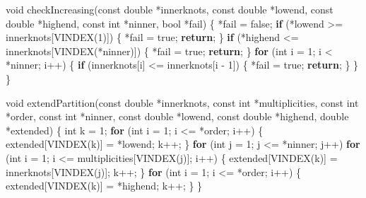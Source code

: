 \documentclass[
  12pt,
]{article}
\newenvironment{Shaded}{\begin{snugshade}}{\end{snugshade}}
\newcommand{\ControlFlowTok}[1]{\textcolor[rgb]{0.13,0.29,0.53}{\textbf{#1}}}
\newcommand{\DataTypeTok}[1]{\textcolor[rgb]{0.13,0.29,0.53}{#1}}
\newcommand{\DecValTok}[1]{\textcolor[rgb]{0.00,0.00,0.81}{#1}}
\newcommand{\NormalTok}[1]{#1}
\begin{document}
\begin{Shaded}
\begin{Highlighting}[]
\DataTypeTok{void}\NormalTok{ checkIncreasing(}\DataTypeTok{const} \DataTypeTok{double}\NormalTok{ *innerknots, }\DataTypeTok{const} \DataTypeTok{double}\NormalTok{ *lowend,}
                     \DataTypeTok{const} \DataTypeTok{double}\NormalTok{ *highend, }\DataTypeTok{const} \DataTypeTok{int}\NormalTok{ *ninner, }\DataTypeTok{bool}\NormalTok{ *fail) \{}
\NormalTok{    *fail = false;}
    \ControlFlowTok{if}\NormalTok{ (*lowend \textgreater{}= innerknots[VINDEX(}\DecValTok{1}\NormalTok{)]) \{}
\NormalTok{        *fail = true;}
        \ControlFlowTok{return}\NormalTok{;}
\NormalTok{    \}}
    \ControlFlowTok{if}\NormalTok{ (*highend \textless{}= innerknots[VINDEX(*ninner)]) \{}
\NormalTok{        *fail = true;}
        \ControlFlowTok{return}\NormalTok{;}
\NormalTok{    \}}
    \ControlFlowTok{for}\NormalTok{ (}\DataTypeTok{int}\NormalTok{ i = }\DecValTok{1}\NormalTok{; i \textless{} *ninner; i++) \{}
        \ControlFlowTok{if}\NormalTok{ (innerknots[i] \textless{}= innerknots[i {-} }\DecValTok{1}\NormalTok{]) \{}
\NormalTok{            *fail = true;}
            \ControlFlowTok{return}\NormalTok{;}
\NormalTok{        \}}
\NormalTok{    \}}
\NormalTok{\}}

\DataTypeTok{void}\NormalTok{ extendPartition(}\DataTypeTok{const} \DataTypeTok{double}\NormalTok{ *innerknots, }\DataTypeTok{const} \DataTypeTok{int}\NormalTok{ *multiplicities,}
                     \DataTypeTok{const} \DataTypeTok{int}\NormalTok{ *order, }\DataTypeTok{const} \DataTypeTok{int}\NormalTok{ *ninner, }\DataTypeTok{const} \DataTypeTok{double}\NormalTok{ *lowend,}
                     \DataTypeTok{const} \DataTypeTok{double}\NormalTok{ *highend, }\DataTypeTok{double}\NormalTok{ *extended) \{}
    \DataTypeTok{int}\NormalTok{ k = }\DecValTok{1}\NormalTok{;}
    \ControlFlowTok{for}\NormalTok{ (}\DataTypeTok{int}\NormalTok{ i = }\DecValTok{1}\NormalTok{; i \textless{}= *order; i++) \{}
\NormalTok{        extended[VINDEX(k)] = *lowend;}
\NormalTok{        k++;}
\NormalTok{    \}}
    \ControlFlowTok{for}\NormalTok{ (}\DataTypeTok{int}\NormalTok{ j = }\DecValTok{1}\NormalTok{; j \textless{}= *ninner; j++)}
        \ControlFlowTok{for}\NormalTok{ (}\DataTypeTok{int}\NormalTok{ i = }\DecValTok{1}\NormalTok{; i \textless{}= multiplicities[VINDEX(j)]; i++) \{}
\NormalTok{            extended[VINDEX(k)] = innerknots[VINDEX(j)];}
\NormalTok{            k++;}
\NormalTok{        \}}
    \ControlFlowTok{for}\NormalTok{ (}\DataTypeTok{int}\NormalTok{ i = }\DecValTok{1}\NormalTok{; i \textless{}= *order; i++) \{}
\NormalTok{        extended[VINDEX(k)] = *highend;}
\NormalTok{        k++;}
\NormalTok{    \}}
\NormalTok{\}}


\end{Highlighting}
\end{Shaded}
\end{document}
